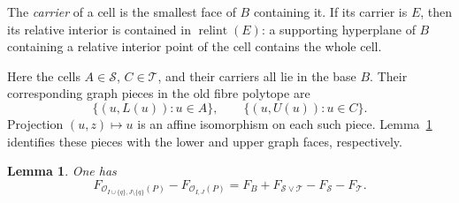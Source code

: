 \documentclass[a4paper,12pt]{amsart}
\newtheorem{lemma}[theorem]{Lemma}
\theoremstyle{definition}
\theoremstyle{remark}
\newcommand{\OO}{\mathcal O}
\newcommand{\relint}{\operatorname{relint}}
\begin{document}
The \emph{carrier} of a cell is the smallest face of $B$ containing it.
If its carrier is $E$, then its relative interior is contained in $\relint(E)$: a supporting hyperplane of $B$ containing a relative interior point of the cell contains the whole cell.

Here the cells $A\in\mathcal S$, $C\in\mathcal T$, and their carriers all lie in the base $B$.
Their corresponding graph pieces in the old fibre polytope are
\[
 \{(u,L(u)):u\in A\},\qquad  \{(u,U(u)):u\in C\}.
\]
Projection $(u,z)\mapsto u$ is an affine isomorphism on each such piece.
Lemma~\ref{lem:faceidentity} identifies these pieces with the lower and upper graph faces, respectively.


\begin{lemma}\label{lem:faceidentity}
One has
\begin{equation}\label{eq:faceidentity}
 F_{\OO_{I\cup\{q\},J\setminus\{q\}}(P)}-F_{\OO_{I,J}(P)}  =F_B+F_{\mathcal S\vee\mathcal T}-F_{\mathcal S}-F_{\mathcal T}.
\end{equation}
\end{lemma}
\end{document}
